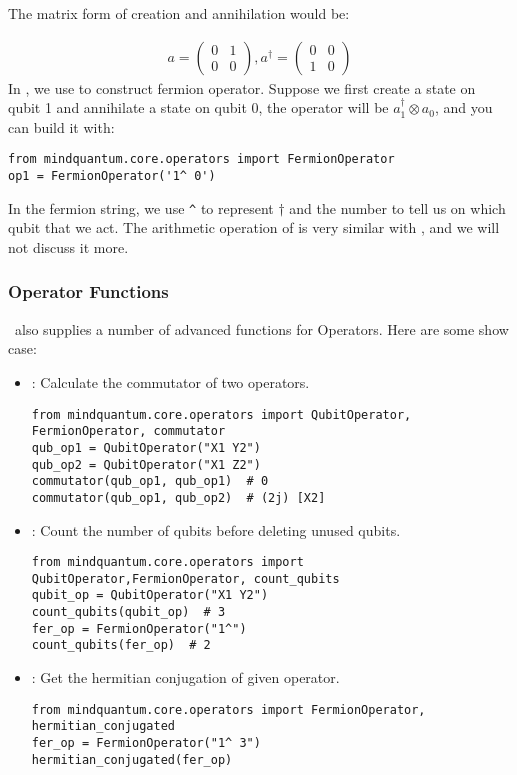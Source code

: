 The matrix form of creation and annihilation would be:

\begin{align*}
    a=\begin{pmatrix}
        0 & 1 \\
        0 & 0
    \end{pmatrix},
    a^\dagger=\begin{pmatrix}
        0 & 0 \\
        1 & 0
    \end{pmatrix}
\end{align*}
In \MindQuantum, we use \FermionOperator to construct fermion operator. Suppose we first create a state on qubit 1 and annihilate a state on qubit 0, the operator will be $a_1^\dagger\otimes a_0$, and you can build it with:
\begin{lstlisting}
from mindquantum.core.operators import FermionOperator
op1 = FermionOperator('1^ 0')
\end{lstlisting}
In the fermion string, we use \verb|^| to represent $\dagger$ and the number to tell us on which qubit that we act. The arithmetic operation of \FermionOperator is very similar with \QubitOperator, and we will not discuss it more.


\subsubsection{Operator Functions}

\MindQuantum\ also supplies a number of advanced functions for Operators. Here are some show case:
\begin{itemize}
    \item {} : Calculate the commutator of two operators.
          \begin{lstlisting}
from mindquantum.core.operators import QubitOperator, FermionOperator, commutator
qub_op1 = QubitOperator("X1 Y2")
qub_op2 = QubitOperator("X1 Z2")
commutator(qub_op1, qub_op1)  # 0
commutator(qub_op1, qub_op2)  # (2j) [X2]
    \end{lstlisting}
    \item {} : Count the number of qubits before deleting unused qubits.
          \begin{lstlisting}
from mindquantum.core.operators import QubitOperator,FermionOperator, count_qubits
qubit_op = QubitOperator("X1 Y2")
count_qubits(qubit_op)  # 3
fer_op = FermionOperator("1^")
count_qubits(fer_op)  # 2
    \end{lstlisting}
    \item {} : Get the hermitian conjugation of given operator.
          \begin{lstlisting}
from mindquantum.core.operators import FermionOperator, hermitian_conjugated
fer_op = FermionOperator("1^ 3")
hermitian_conjugated(fer_op)
    \end{lstlisting}
\end{itemize}

